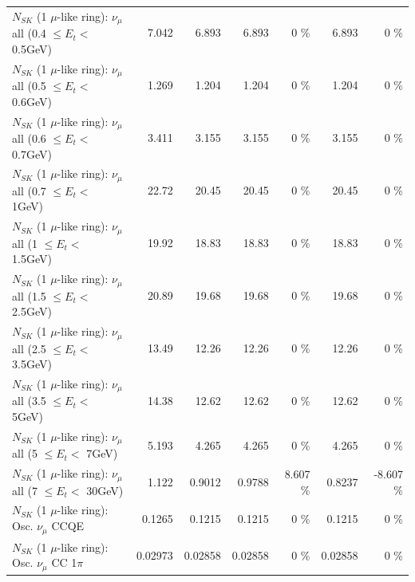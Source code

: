 \begin{table}
\begin{tabular}{| l | r | r | r  r | r  r |}
       $N_{SK}$ (1 $\mu$-like ring): $\nu_{\mu}$ all (0.4 $\leq E_{t} <$ 0.5GeV) &           7.042 &           6.893 &           6.893 &        0 \%  &           6.893 &        0 \%  \\ 
       $N_{SK}$ (1 $\mu$-like ring): $\nu_{\mu}$ all (0.5 $\leq E_{t} <$ 0.6GeV) &           1.269 &           1.204 &           1.204 &        0 \%  &           1.204 &        0 \%  \\ 
       $N_{SK}$ (1 $\mu$-like ring): $\nu_{\mu}$ all (0.6 $\leq E_{t} <$ 0.7GeV) &           3.411 &           3.155 &           3.155 &        0 \%  &           3.155 &        0 \%  \\ 
         $N_{SK}$ (1 $\mu$-like ring): $\nu_{\mu}$ all (0.7 $\leq E_{t} <$ 1GeV) &           22.72 &           20.45 &           20.45 &        0 \%  &           20.45 &        0 \%  \\ 
         $N_{SK}$ (1 $\mu$-like ring): $\nu_{\mu}$ all (1 $\leq E_{t} <$ 1.5GeV) &           19.92 &           18.83 &           18.83 &        0 \%  &           18.83 &        0 \%  \\ 
       $N_{SK}$ (1 $\mu$-like ring): $\nu_{\mu}$ all (1.5 $\leq E_{t} <$ 2.5GeV) &           20.89 &           19.68 &           19.68 &        0 \%  &           19.68 &        0 \%  \\ 
       $N_{SK}$ (1 $\mu$-like ring): $\nu_{\mu}$ all (2.5 $\leq E_{t} <$ 3.5GeV) &           13.49 &           12.26 &           12.26 &        0 \%  &           12.26 &        0 \%  \\ 
         $N_{SK}$ (1 $\mu$-like ring): $\nu_{\mu}$ all (3.5 $\leq E_{t} <$ 5GeV) &           14.38 &           12.62 &           12.62 &        0 \%  &           12.62 &        0 \%  \\ 
           $N_{SK}$ (1 $\mu$-like ring): $\nu_{\mu}$ all (5 $\leq E_{t} <$ 7GeV) &           5.193 &           4.265 &           4.265 &        0 \%  &           4.265 &        0 \%  \\ 
          $N_{SK}$ (1 $\mu$-like ring): $\nu_{\mu}$ all (7 $\leq E_{t} <$ 30GeV) &           1.122 &          0.9012 &          0.9788 &    8.607 \%  &          0.8237 &   -8.607 \%  \\ 
\hline
\hline
                               $N_{SK}$ (1 $\mu$-like ring): Osc. $\nu_\mu$ CCQE &          0.1265 &          0.1215 &          0.1215 &        0 \%  &          0.1215 &        0 \%  \\ 
                          $N_{SK}$ (1 $\mu$-like ring): Osc. $\nu_\mu$ CC 1$\pi$ &         0.02973 &         0.02858 &         0.02858 &        0 \%  &         0.02858 &        0 \%  \\ 

\end{tabular}
\end{table}
